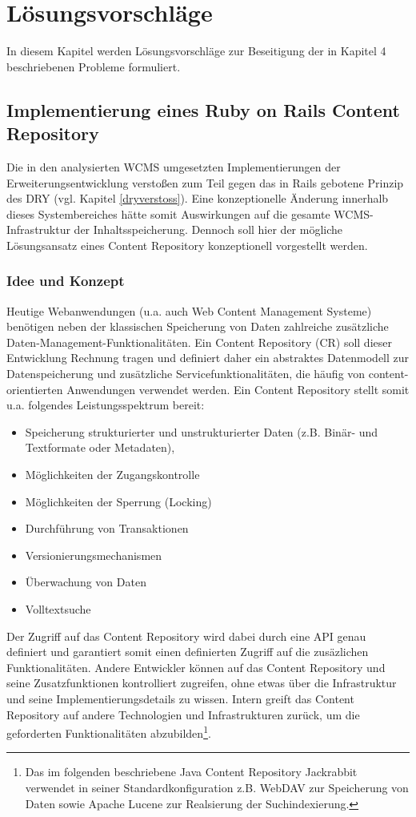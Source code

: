 \chapter{Lösungsvorschläge}
In diesem Kapitel werden Lösungsvorschläge zur Beseitigung der in Kapitel 4 beschriebenen Probleme formuliert.
\section{Implementierung eines Ruby on Rails Content Repository}

Die in den analysierten WCMS umgesetzten Implementierungen der Erweiterungsentwicklung verstoßen zum Teil gegen das in Rails gebotene Prinzip des DRY (vgl. Kapitel \ref{dryverstoss}). Eine konzeptionelle Änderung innerhalb dieses Systembereiches hätte somit Auswirkungen auf die gesamte WCMS-Infrastruktur der Inhaltsspeicherung. Dennoch soll hier der mögliche Lösungsansatz eines Content Repository konzeptionell vorgestellt werden.


\subsection{Idee und Konzept}

Heutige Webanwendungen (u.a. auch Web Content Management Systeme) benötigen neben der klassischen Speicherung von Daten zahlreiche zusätzliche Daten-Management-Funktionalitäten. Ein Content Repository (CR) soll dieser Entwicklung Rechnung tragen und definiert daher ein abstraktes Datenmodell zur Datenspeicherung und zusätzliche Servicefunktionalitäten, die häufig von content-orientierten Anwendungen verwendet werden. Ein Content Repository stellt somit u.a. folgendes Leistungsspektrum bereit:

\begin{itemize}
\item
Speicherung strukturierter und unstrukturierter Daten (z.B. Binär- und Textformate oder Metadaten),
\item
Möglichkeiten der Zugangskontrolle
\item
Möglichkeiten der Sperrung (Locking)
\item
Durchführung von Transaktionen
\item
Versionierungsmechanismen
\item
Überwachung von Daten
\item
Volltextsuche
\end{itemize}

Der Zugriff auf das Content Repository wird dabei durch eine API genau definiert und garantiert somit einen definierten Zugriff auf die zusäzlichen Funktionalitäten. Andere Entwickler können auf das Content Repository und seine Zusatzfunktionen kontrolliert zugreifen, ohne etwas über die Infrastruktur und seine Implementierungsdetails zu wissen. Intern greift das Content Repository auf andere Technologien und Infrastrukturen zurück, um die geforderten Funktionalitäten abzubilden\footnote{Das im folgenden beschriebene Java Content Repository Jackrabbit verwendet in seiner Standardkonfiguration z.B. WebDAV zur Speicherung von Daten sowie Apache Lucene zur Realsierung der Suchindexierung.}.


